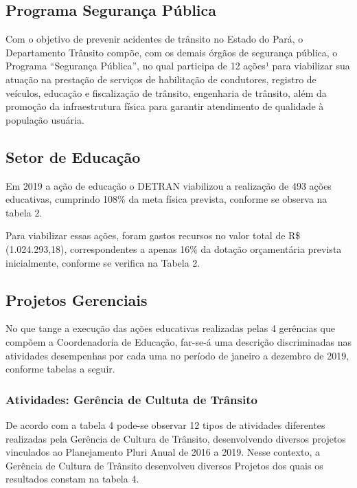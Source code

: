 \documentclass[a4paper]{article}
\begin{document}
\subsection{Programa Segurança Pública}

Com o objetivo de prevenir acidentes de trânsito no Estado do Pará, o Departamento Trânsito compõe, com os demais órgãos de segurança pública, o Programa “Segurança Pública”, no qual participa de 12 ações¹ para viabilizar sua atuação na prestação de serviços de habilitação de condutores, registro de veículos, educação e fiscalização de trânsito, engenharia de trânsito, além da promoção da infraestrutura física para garantir atendimento de qualidade à população usuária.

\subsection{Setor de Educação}

Em 2019 a ação de educação o DETRAN viabilizou a realização de 493 ações educativas, cumprindo 108\% da meta física prevista, conforme se observa na tabela 2. 

Para viabilizar essas ações, foram gastos recursos no valor total de R\$ (1.024.293,18), correspondentes a apenas 16\% da dotação orçamentária prevista inicialmente, conforme se verifica na Tabela 2.


\subsection{Projetos Gerenciais}

No que tange a execução das ações educativas realizadas pelas 4 gerências que compõem a Coordenadoria de Educação, far-se-á uma descrição discriminadas nas atividades desempenhas por cada uma no período de janeiro a dezembro de 2019, conforme tabelas a seguir. 


\subsubsection{Atividades: Gerência de Cultuta de Trânsito}

De acordo com a tabela 4 pode-se observar 12 tipos de atividades diferentes realizadas pela Gerência de Cultura de Trânsito, desenvolvendo diversos projetos vinculados ao Planejamento Pluri Anual de 2016 a 2019. Nesse contexto, a Gerência de Cultura de Trânsito desenvolveu diversos Projetos dos quais os resultados constam na tabela 4.\vskip0.3cm
\end{document}

